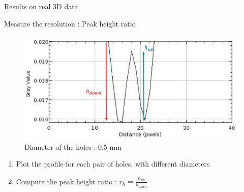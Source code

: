 \documentclass[latex]{beamer}
\begin{document}
\begin{frame}{Results on real 3D data}
\begin{block}{Measure the resolution : Peak height ratio}
\begin{minipage}[htb]{0.46\linewidth}
\begin{figure}
\centering
\includegraphics[scale=0.27]{PeakHeightRatio90pourcent.png}
\caption*{Diameter of the holes : 0.5 mm}
\end{figure}
\end{minipage} \hfill
\begin{minipage}[htb]{0.46\linewidth}
\begin{enumerate}
\item Plot the profile for each pair of holes, with different diameters
\item Compute the peak height ratio : $r_h=\frac{h_{up}}{h_{down}}$
\end{enumerate}
\end{minipage}
\end{block}
\end{frame}
\end{document}
